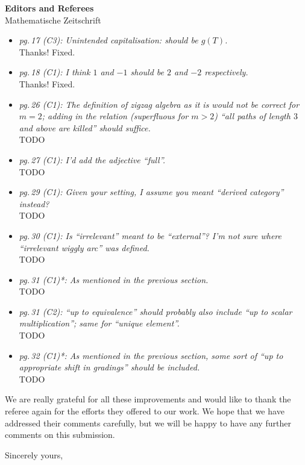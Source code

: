 \documentclass{letter}
\begin{document}
\begin{letter}{{\bf Editors and Referees} \\ Mathematische Zeitschrift}
\begin{itemize}
\item \textsl{\color{gray} pg.\,17 (C3): Unintended capitalisation: should be $g(T)$.} \\
Thanks! Fixed.

\item \textsl{\color{gray} pg.\,18 (C1): I think $1$ and $-1$ should be $2$ and $-2$ respectively.} \\
Thanks! Fixed.

\item \textsl{\color{gray} pg.\,26 (C1): The definition of zigzag algebra as it is would not be correct for $m = 2$; adding in the relation (superfluous for $m > 2$) ``all paths of length $3$ and above are killed'' should suffice.} \\
TODO

\item \textsl{\color{gray} pg.\,27 (C1): I'd add the adjective ``full''.} \\
TODO

\item \textsl{\color{gray} pg.\,29 (C1): Given your setting, I assume you meant ``derived category'' instead?} \\
TODO

\item \textsl{\color{gray} pg.\,30 (C1): Is ``irrelevant'' meant to be ``external''? I’m not sure where ``irrelevant wiggly arc'' was defined.} \\
TODO

\item \textsl{\color{gray} pg.\,31 (C1)*: As mentioned in the previous section.} \\
TODO

\item \textsl{\color{gray} pg.\,31 (C2): ``up to equivalence'' should probably also include ``up to scalar multiplication''; same for ``unique element''.} \\
TODO

\item \textsl{\color{gray} pg.\,32 (C1)*: As mentioned in the previous section, some sort of ``up to appropriate shift in gradings'' should be included.} \\
TODO

\end{itemize}

We are really grateful for all these improvements and would like to thank the referee again for the efforts they offered to our work. We hope that we have addressed their comments carefully, but we will be happy to have any further comments on this submission.

%

\closing{Sincerely yours,}

\end{letter}
\end{document}
